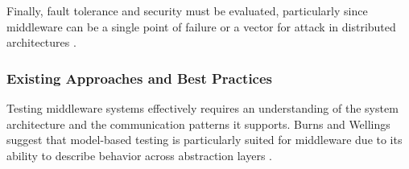 \vspace{1em}
Finally, fault tolerance and security must be evaluated, particularly since middleware can be a single point of failure or a vector for attack in distributed architectures \cite{liu2009middleware}.

\subsubsection{Existing Approaches and Best Practices}

Testing middleware systems effectively requires an understanding of the system architecture and the communication patterns it supports. Burns and Wellings suggest that model-based testing is particularly suited for middleware due to its ability to describe behavior across abstraction layers \cite{burns2009real}.

